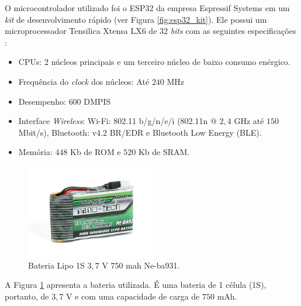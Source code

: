 O microcontrolador utilizado foi o ESP32 da empresa Espressif Systems em um \emph{kit} de desenvolvimento rápido (ver Figura \ref{fig:esp32_kit}). Ele possui um microprocessador Tensilica Xtensa LX6 de $32$ \emph{bits} com as seguintes especificações \cite{esp32:datasheet}:

\begin{itemize}
    \item CPUs: 2 núcleos principais e um terceiro núcleo de baixo consumo enérgico. 
    \item Frequência do \emph{clock} dos núcleos: Até $240$ MHz
    \item Desempenho: $600$ DMPIS
    \item Interface \emph{Wireless}: Wi-Fi: 802.11 b/g/n/e/i (802.11n @ $2,4$ GHz até $150$ Mbit/s), Bluetooth: v4.2 BR/EDR e Bluetooth Low Energy (BLE).
    \item Memória: $448$ Kb de ROM e $520$ Kb de SRAM.
\end{itemize}


\begin{figure}[H]
    \centering
    \includegraphics[width=0.5\textwidth]{figuras/eletronica/bateria.jpg}
    \caption{Bateria Lipo 1S $3,7$ V $750$ mah Ne-ba931.}
    \label{fig:bateria_lipo}
\end{figure}

A Figura \ref{fig:bateria_lipo} apresenta a bateria utilizada. É uma bateria de 1 célula (1S), portanto, de $3,7$ V e com uma capacidade de carga de $750$ mAh.
